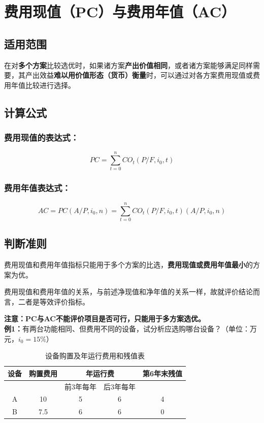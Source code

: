 \section{费用现值（PC）与费用年值（AC）}
\subsection{适用范围}
在对\textbf{多个方案}比较选优时，如果诸方案\textbf{产出价值相同}，或者诸方案能够满足同样需要，其产出效益\textbf{难以用价值形态（货币）衡量}时，可以通过对各方案费用现值或费用年值比较进行选择。

\subsection{计算公式}
\subsubsection{费用现值的表达式：}
$$PC=\sum_{t=0}^{n}CO_{t}(P/F,i_0,t)$$

\subsubsection{费用年值表达式：}
$$AC=PC(A/P,i_0,n)=\sum_{t=0}^{n}CO_{t}(P/F,i_0,t)(A/P,i_0,n)$$

\subsection{判断准则}
费用现值和费用年值指标只能用于多个方案的比选，\textbf{费用现值或费用年值最小}的方案为优。

费用现值和费用年值的关系，与前述净现值和净年值的关系一样，故就评价结论而言，二者是等效评价指标。

\textbf{注意：PC与AC不能评价项目是否可行，只能用于多方案选优。}\\
\textbf{例1：}有两台功能相同、但费用不同的设备，试分析应选购哪台设备？（单位：万元，$i_0 = 15\%$）

\begin{table}[H]
\centering
\begin{tabular}{|c|c|c|c|c|}
\hline
设备 & 购置费用 & \multicolumn{2}{c|}{年运行费} & 第6年末残值 \\ \hline
    &           & 前3年每年 & 后3年每年 &              \\ \hline
A   & 10        & 5         & 6         & 4            \\ \hline
B   & 7.5       & 6         & 6         & 0            \\ \hline
\end{tabular}
\caption{设备购置及年运行费用和残值表}
\end{table}

